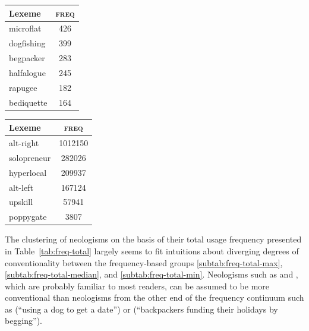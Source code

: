 \documentclass[
  a4paper,
  abstract=on,
  captions=tableabove
  ]{scrartcl}
\begin{document}
\begin{table}
      \vspace{\baselineskip}

        \begin{subtable}{.4\linewidth}
          \label{subtab:freq-total-min}
          \centering
          \begin{tabular}{l S[table-format=3]}
            \toprule
            Lexeme     & {\textsc{freq}} \\
            \midrule
            microflat  & 426             \\
            dogfishing & 399             \\
            begpacker  & 283             \\
            halfalogue & 245             \\
            rapugee    & 182             \\
            bediquette & 164             \\
            \bottomrule
          \end{tabular}
        \end{subtable}
        \begin{subtable}{.4\linewidth}
          \label{subtab:freq-total-cases}
          \centering
          \begin{tabular}{l S[table-format=7]}
            \toprule
            Lexeme       & {\textsc{freq}}  \\
            \midrule
            alt-right    & 1012150 \\
            solopreneur  & 282026  \\
            hyperlocal   & 209937  \\
            alt-left     & 167124  \\
            upskill      & 57941   \\
            poppygate    & 3807    \\
            \bottomrule
          \end{tabular}
        \end{subtable}
      \end{table}

      The clustering of neologisms on the basis of their total usage frequency presented in Table~\ref{tab:freq-total} largely seems to fit intuitions about diverging degrees of conventionality between the frequency-based groups \ref{subtab:freq-total-max}, \ref{subtab:freq-total-median}, and \ref{subtab:freq-total-min}. Neologisms such as  and , which are probably familiar to most readers, can be assumed to be more conventional than neologisms from the other end of the frequency continuum such as  (\enquote{using a dog to get a date}) or  (\enquote{backpackers funding their holidays by begging}).
\end{document}
